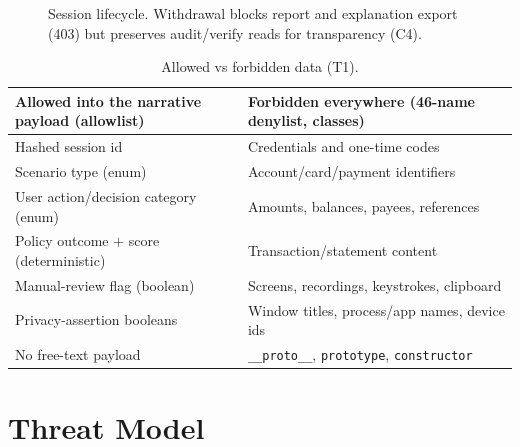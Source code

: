 \documentclass[conference]{IEEEtran}
\begin{document}
\begin{figure}[t]
\centering
{}
\caption{Session lifecycle. Withdrawal blocks report and explanation export
(403) but preserves audit/verify reads for transparency (C4).}
\label{fig:lifecycle}
\end{figure}

\begin{table}[t]
\caption{Allowed vs forbidden data (T1).}
\centering
\footnotesize
\begin{tabular}{p{3.7cm}p{3.7cm}}
\toprule
Allowed into the narrative payload (allowlist) & Forbidden everywhere
(46-name denylist, classes) \\
\midrule
Hashed session id & Credentials and one-time codes \\
Scenario type (enum) & Account/card/payment identifiers \\
User action/decision category (enum) & Amounts, balances, payees, references \\
Policy outcome $+$ score (deterministic) & Transaction/statement content \\
Manual-review flag (boolean) & Screens, recordings, keystrokes, clipboard \\
Privacy-assertion booleans & Window titles, process/app names, device ids \\
No free-text payload & \texttt{\_\_proto\_\_}, \texttt{prototype},
\texttt{constructor} \\
\bottomrule
\end{tabular}
\label{tab:data}
\end{table}

\section{Threat Model}
\end{document}
